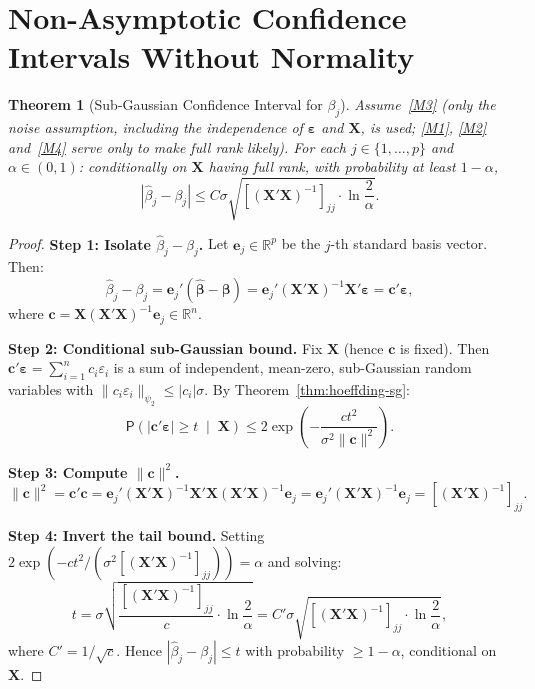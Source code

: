 \documentclass[14pt]{extarticle}
\theoremstyle{plain}
\newtheorem{theorem}{Theorem}[section]
\theoremstyle{definition}
\theoremstyle{remark}
\newcommand\prb{\mathsf{P}}
\newcommand{\bX}{\mathbf{X}}
\def\bb{\boldsymbol{\beta}}
\newcommand{\be}{\boldsymbol{\varepsilon}}
\def\bc{\mathbf{c}}
\newcommand{\Real}{\mathbb{R}}
\newcommand{\hbb}{\hat{\boldsymbol{\beta}}}
\begin{document}
\section{Non-Asymptotic Confidence Intervals Without Normality}\label{sec:confidence}

\begin{theorem}[Sub-Gaussian Confidence Interval for $\beta_j$]\label{thm:ci-modern}
Assume~\ref{M3} (only the noise assumption, including the independence of $\be$ and $\bX$, is used; \ref{M1}, \ref{M2} and~\ref{M4} serve only to make full rank likely). For each $j \in \{1, \ldots, p\}$ and $\alpha \in (0,1)$: conditionally on $\bX$ having full rank, with probability at least $1 - \alpha$,
\begin{equation}\label{eq:ci-modern}
|\hat\beta_j - \beta_j| \leqslant C\sigma\sqrt{[(\bX'\bX)^{-1}]_{jj}\cdot\ln\frac{2}{\alpha}}.
\end{equation}
\end{theorem}

\begin{proof}
\textbf{Step 1: Isolate $\hat\beta_j - \beta_j$.} Let $\mathbf{e}_j \in \Real^p$ be the $j$-th standard basis vector. Then:
\[
\hat\beta_j - \beta_j = \mathbf{e}_j'(\hbb - \bb) = \mathbf{e}_j'(\bX'\bX)^{-1}\bX'\be = \bc'\be,
\]
where $\bc = \bX(\bX'\bX)^{-1}\mathbf{e}_j \in \Real^n$.

\textbf{Step 2: Conditional sub-Gaussian bound.} Fix $\bX$ (hence $\bc$ is fixed). Then $\bc'\be = \sum_{i=1}^n c_i\varepsilon_i$ is a sum of independent, mean-zero, sub-Gaussian random variables with $\|c_i\varepsilon_i\|_{\psi_2} \leqslant |c_i|\sigma$. By Theorem~\ref{thm:hoeffding-sg}:
\[
\prb\!\left(|\bc'\be| \geqslant t \;\middle|\; \bX\right) \leqslant 2\exp\!\left(-\frac{ct^2}{\sigma^2\|\bc\|^2}\right).
\]

\textbf{Step 3: Compute $\|\bc\|^2$.}
\[
\|\bc\|^2 = \bc'\bc = \mathbf{e}_j'(\bX'\bX)^{-1}\bX'\bX(\bX'\bX)^{-1}\mathbf{e}_j = \mathbf{e}_j'(\bX'\bX)^{-1}\mathbf{e}_j = [(\bX'\bX)^{-1}]_{jj}.
\]

\textbf{Step 4: Invert the tail bound.} Setting $2\exp(-ct^2/(\sigma^2[(\bX'\bX)^{-1}]_{jj})) = \alpha$ and solving:
\[
t = \sigma\sqrt{\frac{[(\bX'\bX)^{-1}]_{jj}}{c}\cdot\ln\frac{2}{\alpha}} = C'\sigma\sqrt{[(\bX'\bX)^{-1}]_{jj}\cdot\ln\frac{2}{\alpha}},
\]
where $C' = 1/\sqrt{c}$. Hence $|\hat\beta_j - \beta_j| \leqslant t$ with probability $\geqslant 1 - \alpha$, conditional on $\bX$.
\end{proof}
\end{document}
